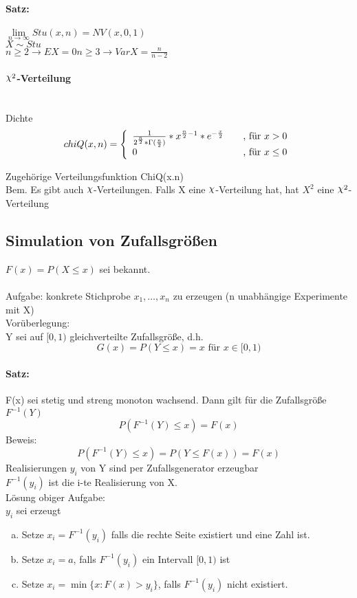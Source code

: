 \documentclass[a4paper,12pt]{scrartcl}
\DeclareRobustCommand{\rchi}{{\mathpalette\irchi\relax}}
\newcommand{\irchi}[2]{\raisebox{\depth}{$#1\chi$}}
\begin{document}
\begin{enumerate}[(a)]
  \paragraph{Satz:} $\underset{n\rightarrow\infty}{\lim}Stu(x,n) = NV(x,0,1)$\\
  $X\sim Stu$\\
  $n\geq 2 \rightarrow EX=0$\quad\quad$n\geq 3 \rightarrow VarX = \frac{n}{n-2} $
  
  \paragraph{$\rchi^2$-Verteilung}\quad\\
  Dichte
  $$chiQ(x,n) = \left \{ 
  \begin{array}{l l}
    \frac{1}{2^{\frac{n}{2}}*\Gamma(\frac{n}{2})}*x^{\frac{n}{2}-1}*e^{-\frac{x}{2}} & \quad \text{, für }x>0\\
    0 & \quad \text{, für } x \leq 0
  \end{array} \right. $$
  
  Zugehörige Verteilungsfunktion ChiQ(x.n)\\
  Bem. Es gibt auch $\rchi$-Verteilungen. Falls X eine $\rchi$-Verteilung hat, hat $X^2$ eine $\rchi^2$-Verteilung
  
\end{enumerate}

\subsection{Simulation von Zufallsgrößen}
$F(x) = P(X\leq x)$ sei bekannt.\\
\\
Aufgabe: konkrete Stichprobe $x_1,\dots,x_n$ zu erzeugen (n unabhängige Experimente mit X)\\
Vorüberlegung:\\
Y sei auf $[0,1)$ gleichverteilte Zufallsgröße, d.h.
$$G(x) = P(Y\leq x) = x \text{   für }x\in[0,1)$$
\paragraph{Satz:} F(x) sei stetig und streng monoton wachsend. Dann gilt für die Zufallsgröße $F^{-1}(Y)$
$$P(F^{-1}(Y)\leq x) = F(x) $$
Beweis:
$$P(F^{-1}(Y)\leq x) = P(Y\leq F(x)) = F(x) $$
Realisierungen $y_i$ von Y sind per Zufallsgenerator erzeugbar\\
$F^{-1}(y_i)$ ist die i-te Realisierung von X.\\
Lösung obiger Aufgabe:\\
$y_i$ sei erzeugt
\begin{enumerate}[(a)]
 \item Setze $x_i = F^{-1}(y_i)$ falls die rechte Seite existiert und eine Zahl ist.
 \item Setze $x_i=a $, falls $F^{-1}(y_i)$ ein Intervall $[0,1)$ ist
 \item Setze $x_i=\min\{x: F(x) > y_i\}$, falls $F^{-1}(y_i)$ nicht existiert. 
\end{enumerate}
\end{document}
